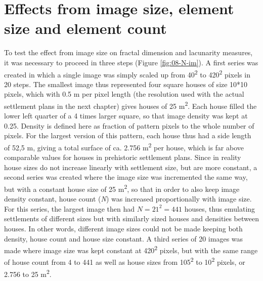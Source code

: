 \documentclass[
  12pt,
]{book}
\begin{document}
\hypertarget{effects-from-image-size-element-size-and-element-count}{%
\section{Effects from image size, element size and element count}\label{effects-from-image-size-element-size-and-element-count}}

To test the effect from image size on fractal dimension and lacunarity measures, it was necessary to proceed in three steps (Figure \ref{fig:08-N-im}). A first series was created in which a single image was simply scaled up from 40\textsuperscript{2} to 420\textsuperscript{2} pixels in 20 steps. The smallest image thus represented four square houses of size 10*10 pixels, which with 0.5 m per pixel length (the resolution used with the actual settlement plans in the next chapter) gives houses of 25 m\textsuperscript{2}. Each house filled the lower left quarter of a 4 times larger square, so that image density was kept at 0.25. Density is defined here as fraction of pattern pixels to the whole number of pixels. For the largest version of this pattern, each house thus had a side length of 52,5 m, giving a total surface of ca. 2.756 m\textsuperscript{2} per house, which is far above comparable values for houses in prehistoric settlement plans. Since in reality house sizes do not increase linearly with settlement size, but are more constant, a second series was created where the image size was incremented the same way, but with a constant house size of 25 m\textsuperscript{2}, so that in order to also keep image density constant, house count (\emph{N}) was increased proportionally with image size. For this series, the largest image then had \(N = 21^2 = 441\) houses, thus emulating settlements of different sizes but with similarly sized houses and densities between houses. In other words, different image sizes could not be made keeping both density, house count and house size constant. A third series of 20 images was made where image size was kept constant at 420\textsuperscript{2} pixels, but with the same range of house count from 4 to 441 as well as house sizes from 105\textsuperscript{2} to 10\textsuperscript{2} pixels, or 2.756 to 25 m\textsuperscript{2}.
\end{document}
